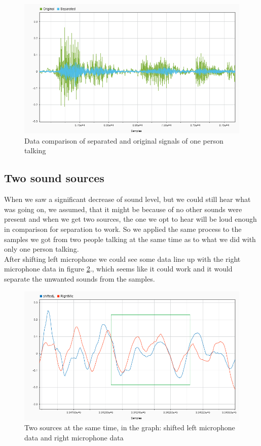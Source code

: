 \begin{figure}[htp]
  \centering
  \includegraphics[width=0.7\linewidth]{Illustrations/OnePersonOriginalAndSeparated.png}
  \caption{Data comparison of separated and original signals of one person talking}
  \label{fig:oneSourceSepAndOG}
\end{figure}

\subsection{Two sound sources}
When we saw a significant decrease of sound level, but we could still hear what was going on, we assumed, that it 
might be because of no other sounds were present and when we get two sources, the one we opt to hear will be loud 
enough in comparison for separation to work. So we applied the same process to the samples we got from two people 
talking at the same time as to what we did with only one person talking.\\

After shifting left microphone we could see some data line up with the right microphone data in figure 
\ref{fig:2sourcesShifted}., which seems like it could work and it would separate the unwanted sounds from the samples. 

\begin{figure}[htp]
  \centering
  \includegraphics[width=0.7\linewidth]{Illustrations/twoSourcesShiftedandOriginal.png}
  \caption{Two sources at the same time, in the graph: shifted left microphone data and right microphone data}
  \label{fig:2sourcesShifted}
\end{figure}

